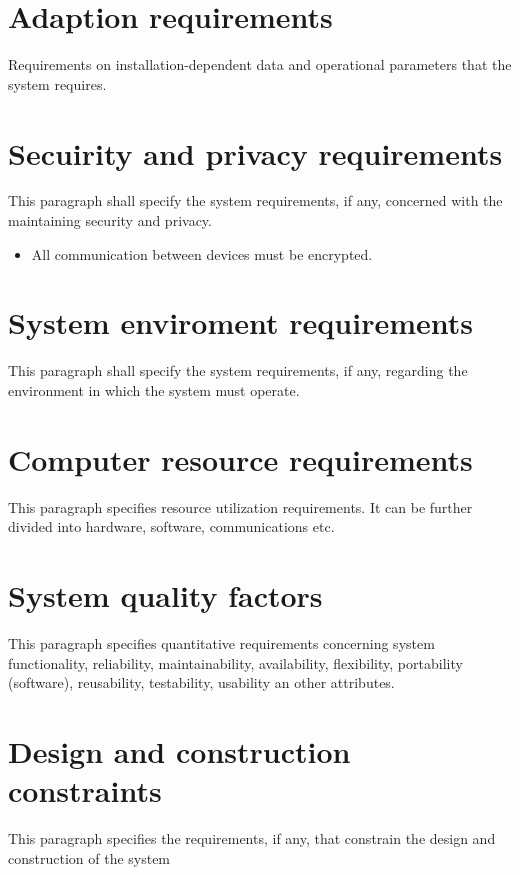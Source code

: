 \section{Adaption requirements}
Requirements on installation-dependent data and operational parameters that the system requires.


\section{Secuirity and privacy requirements}
This paragraph shall specify the system requirements, if any, concerned with the maintaining security and privacy.

\begin{itemize}
	\item All communication between devices must be encrypted.
\end{itemize}

\section{System enviroment requirements}
This paragraph shall specify the system requirements, if any, regarding the environment in which the system must operate.


\section{Computer resource requirements}
This paragraph specifies resource utilization requirements. It can be further divided into hardware, software, communications etc.



\section{System quality factors}
This paragraph specifies quantitative requirements concerning system functionality, reliability, maintainability, availability, flexibility, portability (software), reusability, testability, usability an other attributes.



\section{Design and construction constraints}
This paragraph specifies the requirements, if any, that constrain the design and construction of the system



